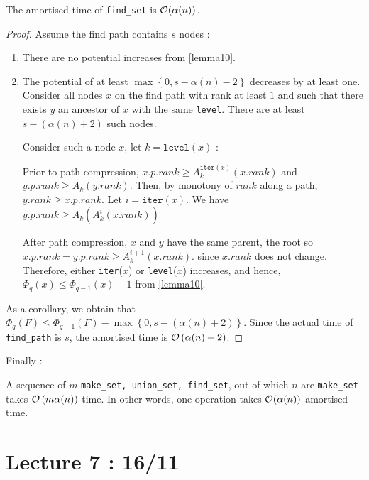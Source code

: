 \documentclass{cours}
\begin{document}
\begin{lemma}
    The amortised time of \texttt{find\_set} is $\mathcal{O}(\alpha(n))$.
\end{lemma}
\begin{proof}
    Assume the find path contains $s$ nodes :
    \begin{enumerate}
        \item There are no potential increases from \ref{lemma10}.
        \item The potential of at least $\max \left\{0, s - \alpha(n) - 2\right\}$ decreases by at least one.
              Consider all nodes $x$ on the find path with rank at least $1$ and such that there exists $y$ an ancestor of $x$ with the same \texttt{level}. There are at least $s - \left(\alpha(n) + 2\right)$ such nodes.

              Consider such a node $x$, let $k = \texttt{level}(x)$ :

              Prior to path compression, $x.p.rank \geq A_{k}^{\texttt{iter}(x)}(x.rank)$ and $y.p.rank \geq A_{k}(y.rank)$. Then, by monotony of $rank$ along a path, $y.rank \geq x.p.rank$. Let $i = \texttt{iter}(x)$. We have $y.p.rank \geq A_{k}\left(A_{k}^{i}(x.rank)\right)$

              After path compression, $x$ and $y$ have the same parent, the root so $x.p.rank = y.p.rank \geq A_{k}^{i + 1}(x.rank)$. since $x.rank$ does not change. Therefore, either \texttt{iter}($x$) or \texttt{level}($x$) increases, and hence, $\Phi_{q}(x) \leq \Phi_{q - 1}(x) - 1$ from \ref{lemma10}.
    \end{enumerate}
    As a corollary, we obtain that $\Phi_{q}(F) \leq \Phi_{q - 1}(F) - \max \left\{0, s - \left(\alpha(n) + 2\right)\right\}$. Since the actual time of \texttt{find\_path} is $s$, the amortised time is $\mathcal{O}\left(\alpha(n) + 2\right)$.
\end{proof}

Finally :

\begin{theorem}
    A sequence of $m$ \texttt{make\_set, union\_set, find\_set}, out of which $n$ are \texttt{make\_set} takes $\mathcal{O}\left(m \alpha(n)\right)$ time. In other words, one operation takes $\mathcal{O}(\alpha(n))$ amortised time.
\end{theorem}

\part[DFS-Matroids-MST]{Lecture 7 : 16/11}  %
\localtableofcontents
\end{document}

